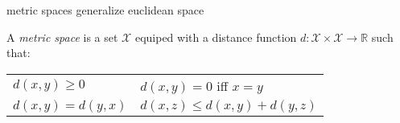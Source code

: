 \begin{frame}[fragile]{metric spaces generalize euclidean space}
{\begin{tikzpicture}[dot/.style={circle,inner sep=2pt,fill,name=#1},
    extended line/.style={shorten >=-#1,shorten <=-#1},
    extended line/.default=1cm]
\end{tikzpicture}
}
\begin{defn}
A \emph{metric space} is a set $\mathcal{X}$ equiped with a distance function $d : \mathcal{X} \times \mathcal{X} \rightarrow \mathbb{R}$ such that:
\begin{center}
\begin{tabular}{ll}
$d(x,y) \ge 0$ & $d(x,y) = 0$ iff $x=y$ \\
$d(x,y) = d(y,x)$ & $d(x,z) \le d(x,y) + d(y,z)$ \\
\end{tabular}
\end{center}
\end{defn}
\end{frame}

